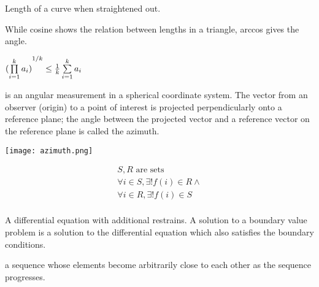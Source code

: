 \begin{definition}
    Length of a curve when straightened out.
\end{definition}
\begin{definition}[arccos]
    While cosine shows the relation between lengths in a triangle, 
    arccos gives the angle.
\end{definition}

\begin{definition}\label{arigeo}
    $
    \newline {(\prod\limits_{i = 1}^{k} a_{i})}^{1/k}
    \leq {1 \over k} \sum\limits_{i = 1}^{k} a_{i}
    $
\end{definition}

\begin{definition}[Azimuth]
     is an angular measurement in a spherical coordinate system. The vector
     from an observer (origin) to a point of interest is projected
     perpendicularly onto a reference plane; the angle between the projected
     vector and a reference vector on the reference plane is called the
     azimuth.

     \texttt{[image: azimuth.png]}

\end{definition}

\begin{definition}[Bijection]
    \begin{align}
        S,R \text{\ are sets} \\
        \forall{i \in S}, \exists!{f(i) \in R} \wedge \\
        \forall{i \in R}, \exists!{f(i) \in S} \\
    \end{align}
\end{definition}

\begin{definition}
    A differential equation with additional restrains. A solution to a boundary
    value problem is a solution to the differential equation which also
    satisfies the boundary conditions.
    
\end{definition}

\begin{definition}
    a sequence whose elements become arbitrarily close to each other as the
    sequence progresses.

\end{definition}

